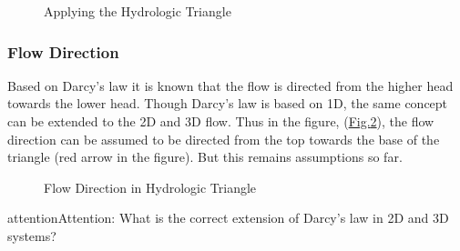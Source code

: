 \documentclass[letterpaper,10pt,english]{sphinxmanual}
\begin{document}
\begin{figure}[htbp]
\centering
\capstart

\noindent{}
\caption{Applying the Hydrologic Triangle}\label{\detokenize{contents/flow/lecture_06/16_darcy_law_3D:hydro-tri2}}\end{figure}


\subsubsection{Flow Direction}
\label{\detokenize{contents/flow/lecture_06/16_darcy_law_3D:flow-direction}}
Based on Darcy’s law it is known that the flow is directed from the higher head towards the lower head. Though Darcy’s law is based on 1D, the same concept can be extended to the 2D and 3D flow. Thus in the figure, (\hyperref[\detokenize{contents/flow/lecture_06/16_darcy_law_3D:hydro-tri3}]{Fig.\@ \ref{\detokenize{contents/flow/lecture_06/16_darcy_law_3D:hydro-tri3}}}), the flow direction can be assumed to be directed from the top towards the base of the triangle (red arrow in the figure). But this remains assumptions so far.

\begin{figure}[htbp]
\centering
\capstart

\noindent{}
\caption{Flow Direction in Hydrologic Triangle}\label{\detokenize{contents/flow/lecture_06/16_darcy_law_3D:hydro-tri3}}\end{figure}

\begin{sphinxadmonition}{attention}{Attention:}
What is the correct extension of Darcy’s law\sphinxhyphen{} in 2D and 3D systems?
\end{sphinxadmonition}
\end{document}
